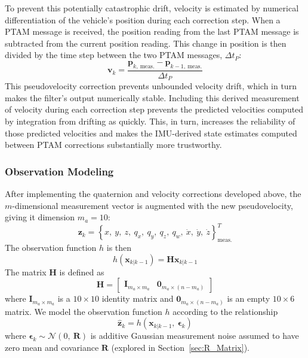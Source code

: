 To prevent this potentially catastrophic drift, velocity is estimated by numerical differentiation of the vehicle's position during each correction step. When a PTAM message is received, the position reading from the last PTAM message is subtracted from the current position reading. This change in position is then divided by the time step between the two PTAM messages, $\Delta t_{P}$:
%
\begin{equation}
\mathbf{v}_{k} = \frac{\mathbf{p}_{k,\ \text{meas.}} - \mathbf{p}_{k-1,\ \text{meas.}}}{\Delta t_{P}}
\end{equation}
%
This pseudovelocity correction prevents unbounded velocity drift, which in turn makes the filter's output numerically stable. Including this derived measurement of velocity during each correction step prevents the predicted velocities computed by integration from drifting as quickly. This, in turn, increases the reliability of those predicted velocities and makes the IMU-derived state estimates computed between PTAM corrections substantially more trustworthy.

\subsubsection{Observation Modeling}

After implementing the quaternion and velocity corrections developed above, the $m$-dimensional measurement vector is augmented with the new pseudovelocity, giving it dimension $m_{a} = 10$:
%
\begin{equation}
\mathbf{z}_{k} = \left\lbrace x,\ y,\ z,\ q_{x},\ q_{y},\ q_{z},\ q_{w},\ \dot{x},\ \dot{y},\ \dot{z} \right\rbrace ^{T} _{\text{meas.}} 
\end{equation}
%
The observation function $h$ is then
%
\begin{equation}
h \left( \mathbf{x}_{k | k-1} \right) = \mathbf{H} \mathbf{x}_{k | k-1}
\end{equation}
%
The matrix $\mathbf{H}$ is defined as
%
\begin{equation}
\mathbf{H} = 
\begin{bmatrix}
\mathbf{I}_{m_{a} \times m_{a}} & \mathbf{0}_{m_{a} \times \left(n-m_{a}\right)}
\end{bmatrix}
\end{equation}
%
where $\mathbf{I}_{m_{a} \times m_{a}}$ is a $10 \times 10$ identity matrix and $\mathbf{0}_{m_{a} \times \left(n-m_{a}\right)}$ is an empty $10 \times 6$ matrix. We model the observation function $h$ according to the relationship
%
\begin{equation}
\hat{\mathbf{z}}_{k} = h \left( \mathbf{x}_{k | k-1},\ \bm{\epsilon}_{k} \right)
\end{equation}
%
where $\bm{\epsilon}_{k} \sim \mathcal{N} \left( 0,\ \mathbf{R} \right)$ is additive Gaussian measurement noise assumed to have zero mean and covariance $\mathbf{R}$ (explored in Section~\ref{sec:R_Matrix}).

